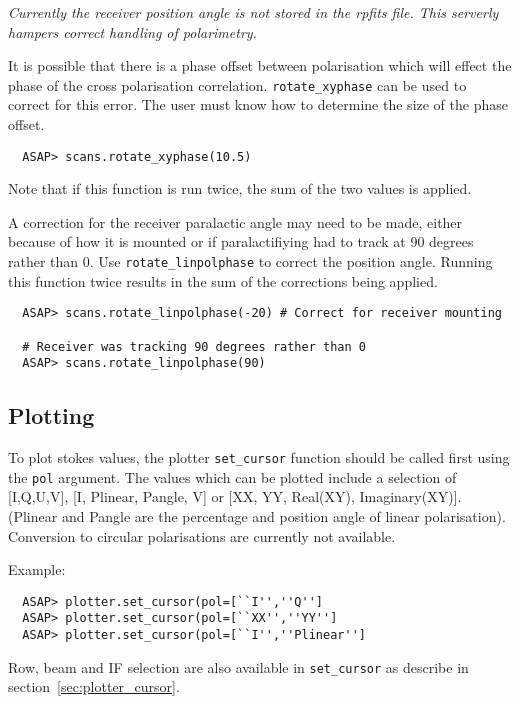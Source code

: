 \documentclass[11pt]{article}
\newcommand{\cmd}[1]{{\tt #1}}
\begin{document}
{\em Currently the receiver position angle is not stored in the rpfits
file. This serverly hampers correct handling of polarimetry.}

It is possible that there is a phase offset between polarisation which
will effect the phase of the cross polarisation
correlation. \cmd{rotate\_xyphase} can be used to correct for this
error. The user must know how to determine the size of the phase
offset.

\begin{verbatim}
  ASAP> scans.rotate_xyphase(10.5)
\end{verbatim}

Note that if this function is run twice, the sum of the two values is
applied.

A correction for the receiver paralactic angle may need to be made,
either because of how it is mounted or if paralactifiying had to track
at 90 degrees rather than 0. Use \cmd{rotate\_linpolphase} to correct
the position angle. Running this function twice results in the sum of
the corrections being applied.

\begin{verbatim}
  ASAP> scans.rotate_linpolphase(-20) # Correct for receiver mounting

  # Receiver was tracking 90 degrees rather than 0
  ASAP> scans.rotate_linpolphase(90)  
\end{verbatim}

\subsection{Plotting}
\label{sec:polplot}

To plot stokes values, the plotter \cmd{set\_cursor} function should
be called first using the \cmd{pol} argument. The values which can be
plotted include a selection of [I,Q,U,V], [I, Plinear, Pangle, V] or
[XX, YY, Real(XY), Imaginary(XY)]. (Plinear and Pangle are the
percentage and position angle of linear polarisation). Conversion to
circular polarisations are currently not available.

Example:

\begin{verbatim}
  ASAP> plotter.set_cursor(pol=[``I'',''Q'']
  ASAP> plotter.set_cursor(pol=[``XX'',''YY'']
  ASAP> plotter.set_cursor(pol=[``I'',''Plinear'']
\end{verbatim}

Row, beam and IF selection are also available in \cmd{set\_cursor} as
describe in section~\ref{sec:plotter_cursor}.
\end{document}
